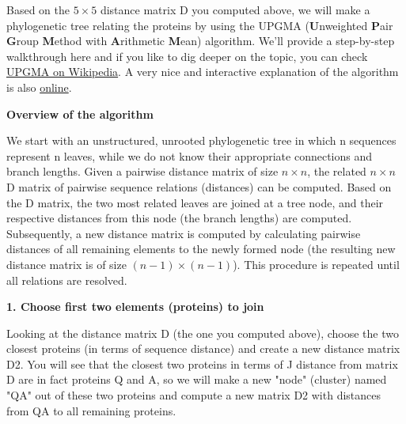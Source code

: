 \documentclass{article}
\begin{document}
\begin{question}[subtitle = Exploring the UPGMA Algorithm]

    Based on the $5 \times 5$ distance matrix D you computed above, we will make a phylogenetic tree relating the proteins by using the UPGMA (\textbf{U}nweighted \textbf{P}air \textbf{G}roup \textbf{M}ethod with \textbf{A}rithmetic \textbf{M}ean) algorithm. We’ll provide a step-by-step walkthrough here and if you like to dig deeper on the topic, you can check \href{https://en.wikipedia.org/wiki/UPGMA}{UPGMA on Wikipedia}. A very nice and interactive explanation of the algorithm is also \href{http://www.slimsuite.unsw.edu.au/teaching/upgma/}{online}.

    \textbf{Overview of the algorithm}

    We start with an unstructured, unrooted phylogenetic tree in which n sequences represent n leaves, while we do not know their appropriate connections and branch lengths. Given a pairwise distance matrix of size $n \times n$, the related $n \times n$ D matrix of pairwise sequence relations (distances) can be computed. Based on the D matrix, the two most related leaves are joined at a tree node, and their respective distances from this node (the branch lengths) are computed. Subsequently, a new distance matrix is computed by calculating pairwise distances of all remaining elements to the newly formed node (the resulting new distance matrix is of size $(n-1) \times (n-1)$). This procedure is repeated until all relations are resolved.

    \textbf{1. Choose first two elements (proteins) to join}

    Looking at the distance matrix D (the one you computed above), choose the two closest proteins (in terms of sequence distance) and create a new distance matrix D2. You will see that the closest two proteins in terms of J distance from matrix D are in fact proteins Q and A, so we will make a new "node" (cluster) named "QA" out of these two proteins and compute a new matrix D2 with distances from QA to all remaining proteins.
    \begin{center}
\end{center}
\end{question}
\end{document}
